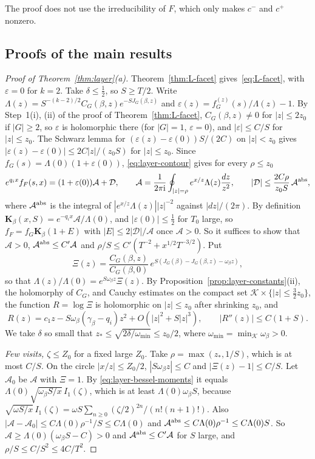 The proof does not use the irreducibility of $F$, which only makes $c^-$ and $c^+$ nonzero.

\subsection{Proofs of the main results}\label{sec:layer-proofs}

\begin{proof}[Proof of Theorem~\ref{thm:layer}\textup{(a)}]
Theorem~\ref{thm:L-facet} gives~\eqref{eq:L-facet}, with $\varepsilon=0$ for $k=2$. Take
$\delta\le\frac12$, so $S\ge T/2$. Write $\Lambda(z)=S^{-(k-2)/2}C_G(\beta,z)e^{-SJ_G(\beta,z)}$
and $\varepsilon(z)=f^{(z)}_G(s)/\Lambda(z)-1$. By Step~1(i), (ii) of the proof of
Theorem~\ref{thm:L-facet}, $C_G(\beta,z)\ne0$ for $|z|\le2z_0$ if $|G|\ge2$, so $\varepsilon$ is
holomorphic there (for $|G|=1$, $\varepsilon=0$), and $|\varepsilon|\le C/S$ for $|z|\le z_0$. The Schwarz lemma for
$(\varepsilon(z)-\varepsilon(0))S/(2C)$ on $|z|<z_0$ gives
$|\varepsilon(z)-\varepsilon(0)|\le2C|z|/(z_0S)$ for $|z|\le z_0$. Since
$f_G(s)=\Lambda(0)(1+\varepsilon(0))$, \eqref{eq:layer-contour} gives for every $\rho\le z_0$
\[
e^{q_ix}f_F(s,x)=(1+\varepsilon(0))\mathcal A+\mathcal D,\qquad \mathcal A=\frac1{2\pi\mathrm i}\oint_{|z|=\rho}e^{x/z}\Lambda(z)\frac{dz}{z^2},\qquad
|\mathcal D|\le\frac{2C\rho}{z_0S}\,\mathcal A^{\rm abs},
\]
where $\mathcal A^{\rm abs}$ is the integral of $|e^{x/z}\Lambda(z)||z|^{-2}$ against $|dz|/(2\pi)$. By
definition $\mathbf K_\beta(x,S)=e^{-q_ix}\mathcal A/\Lambda(0)$, and $|\varepsilon(0)|\le\frac12$
for $T_0$ large, so $f_F=f_G\mathbf K_\beta(1+E)$ with $|E|\le2|\mathcal D|/\mathcal A$ once
$\mathcal A>0$. So it suffices to show that
$\mathcal A>0$, $\mathcal A^{\rm abs}\le C'\mathcal A$ and $\rho/S\le C'(T^{-2}+x^{1/2}T^{-3/2})$. Put
\[
\Xi(z)=\frac{C_G(\beta,z)}{C_G(\beta,0)}\,e^{S(J_G(\beta)-J_G(\beta,z)-\omega_\beta z)},
\]
so that $\Lambda(z)/\Lambda(0)=e^{S\omega_\beta z}\Xi(z)$. By
Proposition~\ref{prop:layer-constants}(ii), the holomorphy of $C_G$, and Cauchy estimates on the
compact set $\mathcal K\times\{|z|\le\frac32z_0\}$, the function $R=\log\Xi$ is
holomorphic on $|z|\le z_0$ after shrinking $z_0$, and
\[
R(z)=c_1z-S\omega_\beta(\gamma_\beta-q_i)z^2+O(|z|^2+S|z|^3),\qquad |R''(z)|\le C(1+S).
\]
We take $\delta$ so small that $z_*\le\sqrt{2\delta/\omega_{\min}}\le z_0/2$, where
$\omega_{\min}=\min_{\mathcal K}\omega_\beta>0$.

\emph{Few visits, $\zeta\le Z_0$} for a fixed large $Z_0$. Take $\rho=\max(z_*,1/S)$, which is
at most $C/S$. On the circle $|x/z|\le Z_0/2$, $|S\omega_\beta z|\le C$ and
$|\Xi(z)-1|\le C/S$. Let $\mathcal A_0$ be $\mathcal A$ with $\Xi=1$. By
\eqref{eq:layer-bessel-moments} it equals $\Lambda(0)\sqrt{\omega_\beta S/x}\,I_1(\zeta)$, which
is at least $\Lambda(0)\omega_\beta S$, because
$\sqrt{\omega S/x}\,I_1(\zeta)=\omega S\sum_{n\ge0}(\zeta/2)^{2n}/(n!(n+1)!)$. Also
$|\mathcal A-\mathcal A_0|\le C\Lambda(0)\rho^{-1}/S\le C\Lambda(0)$ and
$\mathcal A^{\rm abs}\le C\Lambda(0)\rho^{-1}\le C\Lambda(0)S$. So
$\mathcal A\ge\Lambda(0)(\omega_\beta S-C)>0$ and $\mathcal A^{\rm abs}\le C'\mathcal A$ for $S$ large,
and $\rho/S\le C/S^2\le4C/T^2$.


\end{proof}
